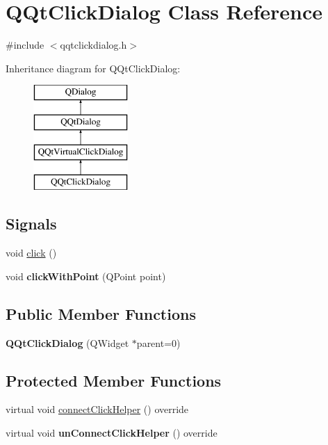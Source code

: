 \hypertarget{class_q_qt_click_dialog}{}\section{Q\+Qt\+Click\+Dialog Class Reference}
\label{class_q_qt_click_dialog}


{\ttfamily \#include $<$qqtclickdialog.\+h$>$}

Inheritance diagram for Q\+Qt\+Click\+Dialog\+:\begin{figure}[H]
\begin{center}
\leavevmode
\includegraphics[height=4.000000cm]{class_q_qt_click_dialog}
\end{center}
\end{figure}
\subsection*{Signals}
\begin{DoxyCompactItemize}
\item 
void \mbox{\hyperlink{class_q_qt_click_dialog_a70d4dac14db4e322ed334888163f5035}{click}} ()
\item 
\mbox{\label{class_q_qt_click_dialog_ac5b9a7cd0b415790a3a353fbd7c369f4}} 
void {\bfseries click\+With\+Point} (Q\+Point point)
\end{DoxyCompactItemize}
\subsection*{Public Member Functions}
\begin{DoxyCompactItemize}
\item 
\mbox{\label{class_q_qt_click_dialog_aaaf587320675239e7bbaff10ae202891}} 
{\bfseries Q\+Qt\+Click\+Dialog} (Q\+Widget $\ast$parent=0)
\end{DoxyCompactItemize}
\subsection*{Protected Member Functions}
\begin{DoxyCompactItemize}
\item 
virtual void \mbox{\hyperlink{class_q_qt_click_dialog_abe0a809f78f668db917f87ddfc50767f}{connect\+Click\+Helper}} () override
\item 
\mbox{\label{class_q_qt_click_dialog_a7c8074d400e7c78329559dd10297db21}} 
virtual void {\bfseries un\+Connect\+Click\+Helper} () override
\end{DoxyCompactItemize}
